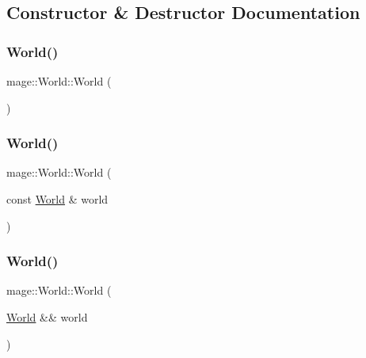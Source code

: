 \subsection{Constructor \& Destructor Documentation}
\hypertarget{classmage_1_1_world_a4b3883a575dcfb8c1f542ecb5938ddc5}{}\label{classmage_1_1_world_a4b3883a575dcfb8c1f542ecb5938ddc5} 
\subsubsection{\texorpdfstring{World()}{World()}\hspace{0.1cm}{\footnotesize\ttfamily [1/3]}}
{\footnotesize\ttfamily mage\+::\+World\+::\+World (\begin{DoxyParamCaption}{ }\end{DoxyParamCaption})}

\hypertarget{classmage_1_1_world_a28e20e33499cd57282cefa5ab0fda041}{}\label{classmage_1_1_world_a28e20e33499cd57282cefa5ab0fda041} 
\subsubsection{\texorpdfstring{World()}{World()}\hspace{0.1cm}{\footnotesize\ttfamily [2/3]}}
{\footnotesize\ttfamily mage\+::\+World\+::\+World (\begin{DoxyParamCaption}\item[{const \hyperlink{classmage_1_1_world}{World} \&}]{world }\end{DoxyParamCaption})\hspace{0.3cm}{\ttfamily [delete]}}

\hypertarget{classmage_1_1_world_a6170766c5b83465cfdbf847e67315d91}{}\label{classmage_1_1_world_a6170766c5b83465cfdbf847e67315d91} 
\subsubsection{\texorpdfstring{World()}{World()}\hspace{0.1cm}{\footnotesize\ttfamily [3/3]}}
{\footnotesize\ttfamily mage\+::\+World\+::\+World (\begin{DoxyParamCaption}\item[{\hyperlink{classmage_1_1_world}{World} \&\&}]{world }\end{DoxyParamCaption})\hspace{0.3cm}{\ttfamily [default]}}

